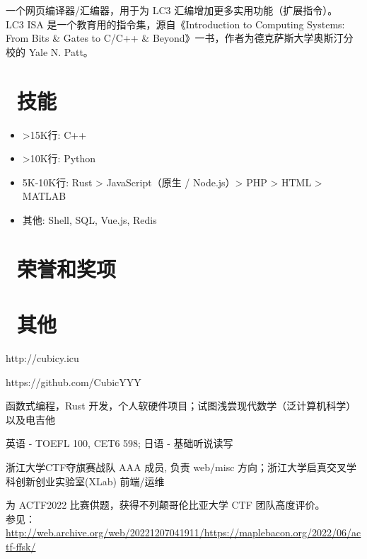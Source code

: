 \documentclass{resume}
\begin{document}
一个网页编译器/汇编器，用于为 LC3 汇编增加更多实用功能（扩展指令）。\\
LC3 ISA 是一个教育用的指令集，源自《Introduction to Computing Systems: From Bits \& Gates to C/C++ \& Beyond》一书，作者为德克萨斯大学奥斯汀分校的 Yale N. Patt。

\section{\faCogs\ 技能}
\begin{itemize}[parsep=0.5ex]
  \item >15K行: C++
  \item >10K行: Python
  \item 5K-10K行: Rust > JavaScript（原生 / Node.js）> PHP > HTML > MATLAB
  \item 其他: Shell, SQL, Vue.js, Redis
\end{itemize}


\section{\faHeartO\ 荣誉和奖项}

\section{\faInfo\ 其他}
\begin{description}[parsep=0.5ex]
  \item[技术博客] http://cubicy.icu
  \item[GitHub] https://github.com/CubicYYY
  \item[个人兴趣] 函数式编程，Rust 开发，个人软硬件项目；试图浅尝现代数学（泛计算机科学）以及电吉他
  \item[语言能力] 英语 - TOEFL 100, CET6 598; 日语 - 基础听说读写
  \item[团队参与] 浙江大学CTF夺旗赛战队 AAA 成员, 负责 web/misc 方向；浙江大学启真交叉学科创新创业实验室(XLab) 前端/运维
  \item[杂项] 为 ACTF2022 比赛供题，获得不列颠哥伦比亚大学 CTF 团队高度评价。 \\
  参见：\href{http://web.archive.org/web/20221207041911/https://maplebacon.org/2022/06/actf-ffsk/}{http://web.archive.org/web/20221207041911/https://maplebacon.org/2022/06/actf-ffsk/}
\end{description}

%
%
\end{document}
